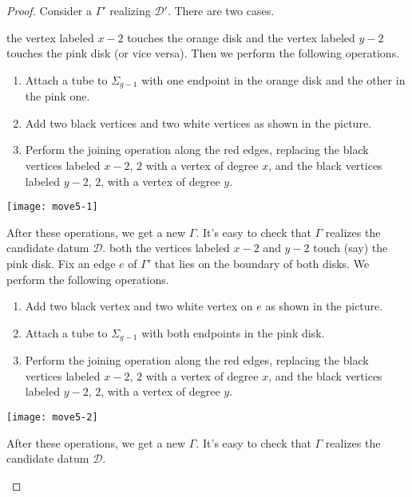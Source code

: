 \documentclass{article}
\begin{document}
\begin{proof}
Consider a \dessin{} $\Gamma'$ realizing $\mathcal{D}'$. There are two cases.
\begin{manycases}
\case the vertex labeled $x-2$ touches the orange disk and the vertex labeled $y-2$ touches the pink disk (or vice versa). Then we perform the following operations.
\begin{enumerate}
\item Attach a tube to $\Sigma_{g-1}$ with one endpoint in the orange disk and the other in the pink one.
\item Add two black vertices and two white vertices as shown in the picture.
\item Perform the joining operation along the red edges, replacing the black vertices labeled $x-2$, $2$ with a vertex of degree $x$, and the black vertices labeled $y-2$, $2$, with a vertex of degree $y$.
\end{enumerate}
\begin{center}
\texttt{[image: move5-1]}
\end{center}
After these operations, we get a new \dessin{} $\Gamma$. It's easy to check that $\Gamma$ realizes the candidate datum $\mathcal{D}$.
\case both the vertices labeled $x-2$ and $y-2$ touch (say) the pink disk. Fix an edge $e$ of $\Gamma'$ that lies on the boundary of both disks. We perform the following operations.
\begin{enumerate}
\item Add two black vertex and two white vertex on $e$ as shown in the picture.
\item Attach a tube to $\Sigma_{g-1}$ with both endpoints in the pink disk.
\item Perform the joining operation along the red edges, replacing the black vertices labeled $x-2$, $2$ with a vertex of degree $x$, and the black vertices labeled $y-2$, $2$, with a vertex of degree $y$.
\end{enumerate}
\begin{center}
\texttt{[image: move5-2]}
\end{center}
After these operations, we get a new \dessin{} $\Gamma$. It's easy to check that $\Gamma$ realizes the candidate datum $\mathcal{D}$.\qedhere
\end{manycases}
\end{proof}
\end{document}
